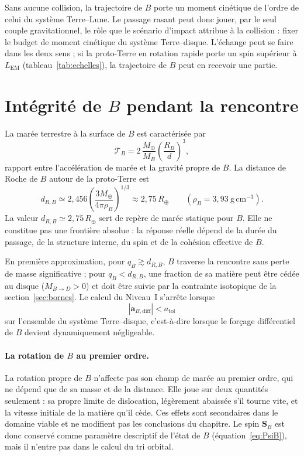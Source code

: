 \documentclass[11pt,a4paper,openany]{report}
\newcommand{\Mt}{M_{\oplus}}
\newcommand{\Rt}{R_{\oplus}}
\begin{document}
\begin{apport}
Sans aucune collision, la trajectoire de $B$ porte un moment cinétique de l'ordre de celui du
système Terre--Lune. Le passage rasant peut donc jouer, par le seul couple gravitationnel, le
rôle que le scénario d'impact attribue à la collision : fixer le budget de moment cinétique du
système Terre--disque. L'échange peut se faire dans les deux sens ; si la proto-Terre en rotation
rapide porte un spin supérieur à $L_{\mathrm{EM}}$ (tableau~\ref{tab:echelles}), la trajectoire de $B$
peut en recevoir une partie.
\end{apport}

\section{Intégrité de \texorpdfstring{$B$}{B} pendant la rencontre}

La marée terrestre à la surface de $B$ est caractérisée par
\begin{equation}
\mathcal{T}_B=2\,\frac{\Mt}{M_B}\left(\frac{R_B}{d}\right)^3,
\label{eq:TB}
\end{equation}
rapport entre l'accélération de marée et la gravité propre de $B$. La distance de Roche de $B$
autour de la proto-Terre est
\begin{equation}
d_{R,B}\simeq2{,}456\left(\frac{3\Mt}{4\pi\rho_B}\right)^{1/3}\approx2{,}75\,\Rt
\qquad(\rho_B=3{,}93\ \mathrm{g\,cm^{-3}}).
\label{eq:RocheB}
\end{equation}
La valeur $d_{R,B}\simeq2{,}75\,\Rt$ sert de repère de marée statique pour $B$. Elle ne constitue
pas une frontière absolue : la réponse réelle dépend de la durée du passage, de la structure
interne, du spin et de la cohésion effective de $B$.

En première approximation, pour $q_B\gtrsim d_{R,B}$, $B$ traverse la rencontre sans perte de masse significative ; pour
$q_B<d_{R,B}$, une fraction de sa matière peut être cédée au disque ($M_{B\to D}>0$) et doit être
suivie par la contrainte isotopique de la section~\ref{sec:bornes}. Le calcul du Niveau~I s'arrête
lorsque
\begin{equation}
|\mathbf{a}_{B,\mathrm{diff}}|<a_{\mathrm{tol}}
\label{eq:atol}
\end{equation}
sur l'ensemble du système Terre--disque, c'est-à-dire lorsque le forçage différentiel de $B$
devient dynamiquement négligeable.

\paragraph{La rotation de \texorpdfstring{$B$}{B} au premier ordre.}
La rotation propre de $B$ n'affecte pas son champ de marée au premier ordre, qui ne dépend que de
sa masse et de la distance. Elle joue sur deux quantités seulement : sa propre limite de
dislocation, légèrement abaissée s'il tourne vite, et la vitesse initiale de la matière qu'il
cède. Ces effets sont secondaires dans le domaine viable et ne modifient pas les conclusions du
chapitre. Le spin $\mathbf{S}_B$ est donc conservé comme paramètre descriptif de l'état de $B$
(équation~\eqref{eq:PsiB}), mais il n'entre pas dans le calcul du tri orbital.
\end{document}
